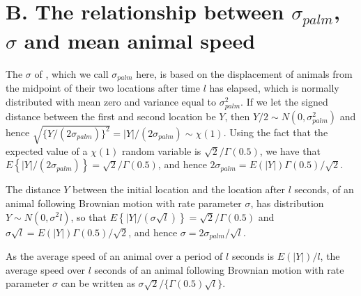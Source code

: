 \documentclass[useAMS, usenatbib, referee]{biom}\usepackage[]{graphicx}\usepackage[]{color}
\begin{document}


\section{B. The relationship between $\sigma_{palm}$, $\sigma$ and mean animal speed}
\label{appx:sigmaspd}

The $\sigma$ of \cite{Stevenson+al:18}, which we call $\sigma_{palm}$ here, is based on the displacement of animals from the midpoint of their two locations after time $l$ has elapsed, which is normally distributed with mean zero and variance equal to $\sigma_{palm}^2$. If we let the signed distance between the first and second location be $Y$, then $Y/2\sim N(0,\sigma_{palm}^2)$ and hence $\sqrt{\{Y/(2\sigma_{palm})\}^2}=|Y|/(2\sigma_{palm})\sim\chi(1)$. Using the fact that the expected value of a $\chi(1)$ random variable is $\sqrt{2}/\Gamma(0.5)$, we have that $E\left\{|Y|/(2\sigma_{palm})\right\}=\sqrt{2}/\Gamma(0.5)$, and hence $2\sigma_{palm}=E(|Y|)\Gamma(0.5)/\sqrt{2}$.

The distance $Y$ between the initial location and the location after $l$ seconds, of an animal following Brownian motion with rate parameter $\sigma$, has distribution $Y\sim N(0,\sigma^2l)$, so that $E\left\{|Y|/(\sigma\sqrt{l})\right\}=\sqrt{2}/\Gamma(0.5)$ and $\sigma\sqrt{l}=E(|Y|)\Gamma(0.5)/\sqrt{2}$, and hence $\sigma=2\sigma_{palm}/\sqrt{l}$.

As the average speed of an animal over a period of $l$ seconds is $E(|Y|)/l$, the average speed over $l$ seconds of an animal following Brownian motion with rate parameter $\sigma$ can be written as $\sigma\sqrt{2}/\{\Gamma(0.5)\sqrt{l}\}$.

\end{document}
